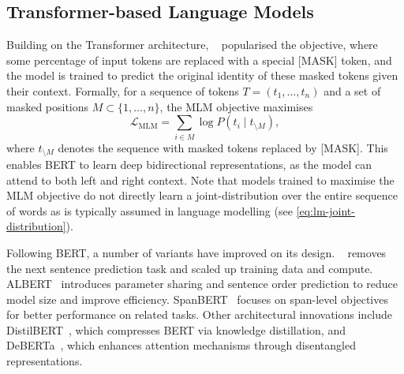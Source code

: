 
\subsection{Transformer-based Language Models}

Building on the Transformer architecture, ~\citep{devlin2019bert} popularised the  objective, where some percentage of input tokens are replaced with a special [MASK] token, and the model is trained to predict the original identity of these masked tokens given their context. Formally, for a sequence of tokens $T = (t_1, \ldots, t_n)$ and a set of masked positions $M \subset \{1, \ldots, n\}$, the MLM objective maximises
\begin{equation}
    \mathcal{L}_{\text{MLM}} = \sum_{i \in M} \log P(t_i \mid t_{\setminus M}),
\end{equation}
where $t_{\setminus M}$ denotes the sequence with masked tokens replaced by [MASK]. This enables BERT to learn deep bidirectional representations, as the model can attend to both left and right context. Note that models trained to maximise the MLM objective do not directly learn a joint-distribution over the entire sequence of words as is typically assumed in language modelling (see \cref{eq:lm-joint-distribution}).

Following BERT, a number of variants have improved on its design. ~\citep{liu2019roberta} removes the next sentence prediction task and scaled up training data and compute. ALBERT~\citep{lan2019albert} introduces parameter sharing and sentence order prediction to reduce model size and improve efficiency. SpanBERT~\citep{joshi2020spanbert} focuses on span-level objectives for better performance on related tasks. Other architectural innovations include DistilBERT~\citep{sanh2019distilbert}, which compresses BERT via knowledge distillation, and DeBERTa~\citep{he2021deberta}, which enhances attention mechanisms through disentangled representations.

